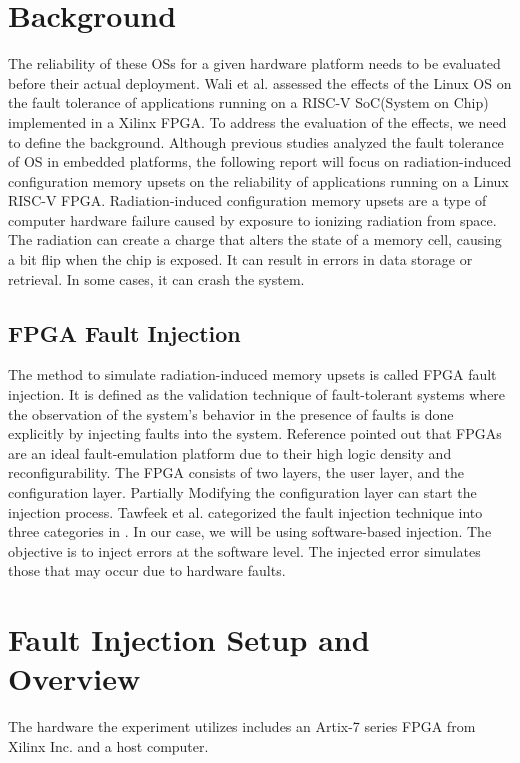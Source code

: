 \documentclass[conference]{IEEEtran}
\begin{document}
\section{Background}
The reliability of these OSs for a given hardware platform needs to be evaluated before their actual deployment.
Wali et al. \cite{b2} assessed the effects of the Linux OS on the fault tolerance of applications running on a RISC-V 
SoC(System on Chip) implemented in a Xilinx FPGA. To address the evaluation of the effects, we need to define the 
background. Although previous studies analyzed the fault tolerance of OS in embedded platforms, the following 
report will focus on radiation-induced configuration memory upsets on the reliability of applications running on 
a Linux RISC-V FPGA. Radiation-induced configuration memory upsets are a type of computer hardware failure caused 
by exposure to ionizing radiation from space. The radiation can create a charge that alters the state of a memory 
cell, causing a bit flip when the chip is exposed. It can result in errors in data storage or retrieval. In some
cases, it can crash the system. 
\subsection{FPGA Fault Injection} %
The method to simulate radiation-induced memory upsets is called FPGA fault injection. It is defined as the validation technique of fault-tolerant 
systems where the observation of the system's behavior in the presence of faults is done explicitly by 
injecting faults into the system. Reference \cite{b2} pointed out that FPGAs are an ideal fault-emulation platform 
due to their high logic density and reconfigurability. The FPGA consists of two layers, the user layer, and the configuration 
layer. Partially Modifying the configuration layer can start the injection process. Tawfeek et al. categorized the fault 
injection technique into three categories in \cite{b6}. In our case, we will be using software-based injection. 
The objective is to inject errors at the software level. The injected error simulates those that may occur due to hardware faults. 

\section{Fault Injection Setup and Overview}
The hardware the experiment utilizes includes an Artix-7 series FPGA from Xilinx Inc. and a host computer. 
\end{document}
